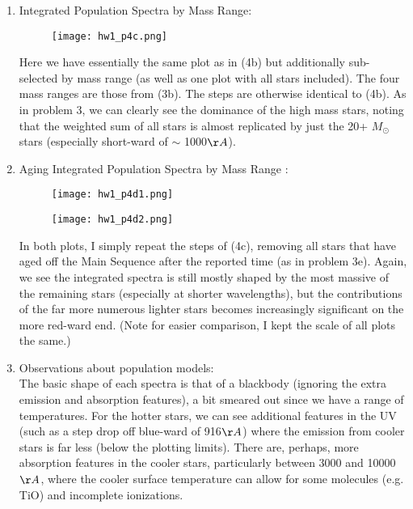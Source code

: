 \documentclass[11pt]{article}
\begin{document}
\begin{enumerate}
\begin{enumerate}
		  
\newpage 		  
  	\item %
 	  Integrated Population Spectra by Mass Range:
 	  
			  \begin{figure}[H]
  			  		\texttt{[image: hw1\_p4c.png]}
  			  		\label{fig:fig9}
			  \end{figure}
			  
			  
	Here we have essentially the same plot as in (4b) but additionally sub-selected by mass range (as well as one plot with all stars included). The four mass ranges are those from (3b). The steps are otherwise identical to (4b). As in problem 3, we can clearly see the dominance of the high mass stars, noting that the weighted sum of all stars is almost replicated by just the 20+ $M_{\odot}$ stars (especially short-ward of $\sim$ 1000$\AA$).\\


			  
	\item %
		Aging Integrated Population Spectra by Mass Range :
\newpage 
			\begin{figure}[H]
			  		\texttt{[image: hw1\_p4d1.png]}
			  		\label{fig:fig10}
			\end{figure}
			
			\begin{figure}[H]
			  		\texttt{[image: hw1\_p4d2.png]}
			  		\label{fig:fig11}
			\end{figure}

	In both plots, I simply repeat the steps of (4c), removing all stars that have aged off the Main Sequence after the reported time (as in problem 3e). Again, we see the integrated spectra is still mostly shaped by the most massive of the remaining stars (especially at shorter wavelengths), but the contributions of the far more numerous lighter stars becomes increasingly significant on the more red-ward end. (Note for easier comparison, I kept the scale of all plots the same.)\\

	\item %
		Observations about population models:\\
		
		The basic shape of each spectra is that of a blackbody (ignoring the extra emission and absorption features), a bit smeared out since we have a range of temperatures. For the hotter stars, we can see additional features in the UV (such as a step drop off blue-ward of 916$\AA$) where the emission from cooler stars is far less (below the plotting limits). There are, perhaps, more absorption features in the cooler stars, particularly between 3000 and 10000 $\AA$, where the cooler surface temperature can allow for some molecules (e.g. TiO) and incomplete ionizations.\\
		

\end{enumerate}
\end{enumerate}
\end{document}
